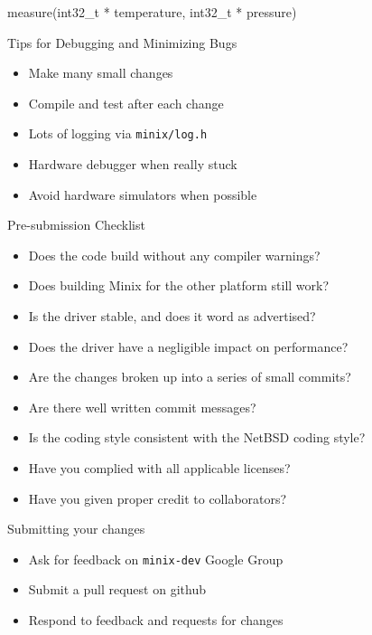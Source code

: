 \documentclass{beamer}
\begin{document}
\begin{frame}{measure(int32\_t * temperature, int32\_t * pressure)}
  \lstI
\end{frame}

\begin{frame}{Tips for Debugging and Minimizing Bugs}
  \begin{itemize}
  \item Make many small changes
  \item Compile and test after each change
  \item Lots of logging via \texttt{minix/log.h}
  \item Hardware debugger when really stuck
  \item Avoid hardware simulators when possible
  \end{itemize}
\end{frame}

\begin{frame}{Pre-submission Checklist}
  \begin{itemize}
  \item Does the code build without any compiler warnings?
  \item Does building Minix for the other platform still work?
  \item Is the driver stable, and does it word as advertised?
  \item Does the driver have a negligible impact on performance?
  \item Are the changes broken up into a series of small commits?
  \item Are there well written commit messages?
  \item Is the coding style consistent with the NetBSD coding style?
  \item Have you complied with all applicable licenses?
  \item Have you given proper credit to collaborators?
  \end{itemize}
\end{frame}

\begin{frame}{Submitting your changes}
  \begin{itemize}
  \item Ask for feedback on \texttt{minix-dev} Google Group
  \item Submit a pull request on github
  \item Respond to feedback and requests for changes
  \end{itemize}
\end{frame}
\end{document}
